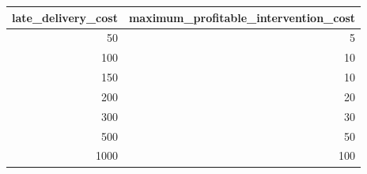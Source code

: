 \begin{tabular}{rr}
\toprule
late_delivery_cost & maximum_profitable_intervention_cost \\
\midrule
50 & 5 \\
100 & 10 \\
150 & 10 \\
200 & 20 \\
300 & 30 \\
500 & 50 \\
1000 & 100 \\
\bottomrule
\end{tabular}
